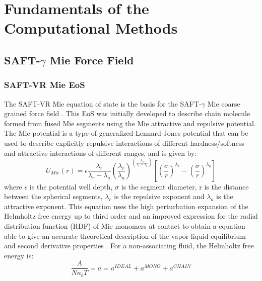\chapter{Fundamentals of the Computational Methods} %

\label{Chapter3} %


\section{SAFT-$\gamma$ Mie Force Field}

\subsection{SAFT-VR Mie EoS}

The SAFT-VR Mie equation of state \cite{lafitte2013} is the basis for the SAFT-$\gamma$ Mie coarse grained force field \cite{avendano2011}. This EoS was initially developed to describe chain molecule formed from fused Mie segments using the Mie attractive and repulsive potential. The Mie potential is a type of generalized Lennard-Jones potential that can be used to describe explicitly repulsive interactions of different hardness/softness and attractive interactions of different ranges, and is given by:
\begin{equation}
U_{Mie}(r) = \epsilon\frac{\lambda_r}{\lambda_r - \lambda_a} \left(\frac{\lambda_r}{\lambda_a} \right)^{\left( \frac{\lambda_a}{\lambda_r - \lambda_a} \right)}
\left[ \left(\frac{\sigma}{r} \right)^{\lambda_r} - \left(\frac{\sigma}{r} \right)^{\lambda_a} \right]
\label{eqn:miepotential}
\end{equation}
where $\epsilon$ is the potential well depth, $\sigma$ is the segment diameter, r is the distance between the spherical segments, $\lambda_r$ is the repulsive exponent and $\lambda_a$ is the attractive exponent. This equation uses the  high perturbation expansion of the Helmholtz free energy up to third order and an improved expression for the  radial distribution function (RDF) of Mie monomers at contact to obtain a equation able to give an accurate theoretical description of the vapor-liquid equilibrium and second derivative properties \cite{lafitte2013}. For a non-associating fluid, the Helmholtz free energy is:
\begin{equation}
\frac{A}{N\kappa_{b}T} = a = a^{IDEAL} + a^{MONO} + a^{CHAIN}
\label{eqn:miehelm}
\end{equation}

